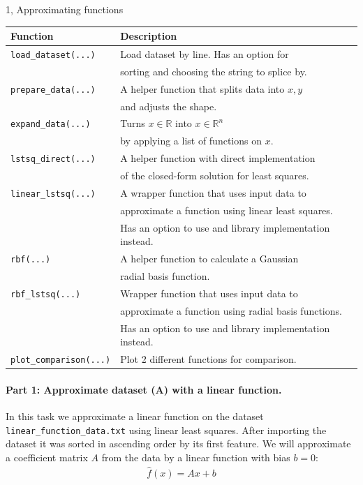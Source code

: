 \begin{task}{1, Approximating functions}
\begin{center}
    \bgroup
    \def\arraystretch{1.5}
    \begin{tabular}{ |l|l| } 
    \hline
    Function & Description\\
    \hline
    \verb|load_dataset(...)| & Load dataset by line. Has an option for\\
    & sorting and choosing the string to splice by.\\
    \hline
    \verb|prepare_data(...)| & A helper function that splits data into $x,y$\\
    & and adjusts the shape.\\
    \hline
    \verb|expand_data(...)| & Turns $x\in\mathbb{R}$ into $x\in\mathbb{R}^n$\\
    & by applying a list of functions on $x$.\\
    \hline
    \verb|lstsq_direct(...)| & A helper function with direct implementation\\
    & of the closed-form solution for least squares.\\
    \hline
    \verb|linear_lstsq(...)| & A wrapper function that uses input data to\\
    & approximate a function using linear least squares.\\
    &Has an option to use and library implementation instead.\\
    \hline
    \verb|rbf(...)| & A helper function to calculate a Gaussian\\
    & radial basis function.\\
    \hline
    \verb|rbf_lstsq(...)| & Wrapper function that uses input data to\\
    & approximate a function using radial basis functions.\\
    & Has an option to use and library implementation instead.\\
    \hline
    \verb|plot_comparison(...)| & Plot 2 different functions for comparison.\\
    \hline
    \end{tabular}
    \egroup
\end{center}

\paragraph{Part 1: Approximate dataset (A) with a linear function.}
In this task we approximate a linear function on the dataset \verb|linear_function_data.txt| using linear least squares. After importing the dataset it was sorted in ascending order by its first feature. We will approximate a coefficient matrix $A$ from the data by a linear function with bias $b=0$:
\begin{align*}
    \hat{f}(x)=Ax+b
\end{align*}


\end{task}
